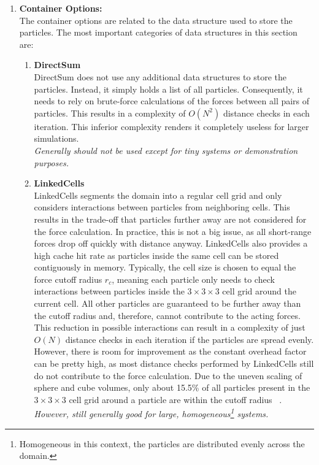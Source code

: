 \begin{enumerate}[label=\textbf{\arabic*.}]
      \item \textbf{Container Options:} \\
            The container options are related to the data structure used to store the particles. The most important categories of data structures in this section are:
            \begin{enumerate}
                  \item \textbf{DirectSum} \\
                        DirectSum does not use any additional data structures to store the particles. Instead, it simply holds a list of all particles. Consequently, it needs to rely on brute-force calculations of the forces between all pairs of particles. This results in a complexity of $O(N^2)$ distance checks in each iteration. This inferior complexity renders it completely useless for larger simulations.\\
                        \textit{Generally should not be used except for tiny systems or demonstration purposes.~\cite{VICCIONE2008625}}
                  \item \textbf{LinkedCells} \\
                        LinkedCells segments the domain into a regular cell grid and only considers interactions between particles from neighboring cells. This results in the trade-off that particles further away are not considered for the force calculation. In practice, this is not a big issue, as all short-range forces drop off quickly with distance anyway.
                        LinkedCells also provides a high cache hit rate as particles inside the same cell can be stored contiguously in memory. Typically, the cell size is chosen to equal the force cutoff radius $r_c$, meaning each particle only needs to check interactions between particles inside the $3\times3\times3$ cell grid around the current cell. All other particles are guaranteed to be further away than the cutoff radius and, therefore, cannot contribute to the acting forces.
                        This reduction in possible interactions can result in a complexity of just $O(N)$ distance checks in each iteration if the particles are spread evenly. However, there is room for improvement as the constant overhead factor can be pretty high, as most distance checks performed by LinkedCells still do not contribute to the force calculation. Due to the uneven scaling of sphere and cube volumes, only about 15.5\% of all particles present in the $3\times3\times3$ cell grid around a particle are within the cutoff radius ~\cite{GRATL2019748}.\\
                        \textit{However, still generally good for large, homogeneous\footnote{Homogeneous in this context, the particles are distributed evenly across the domain.} systems.}


\end{enumerate}
\end{enumerate}
